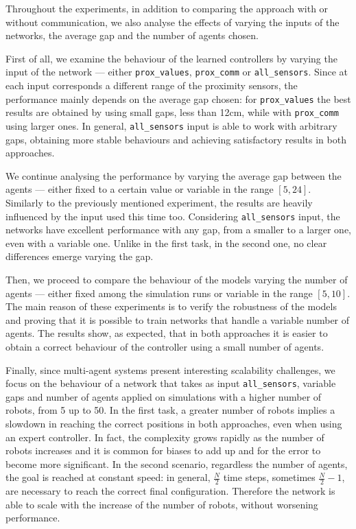 Throughout the experiments, in addition to comparing the approach with or 
without communication, we also analyse the effects of varying the inputs of the 
networks, the average gap and the number of agents chosen. 

First of all, we examine the behaviour of the learned controllers by varying the 
input of the network — either \texttt{prox\_values}, \texttt{prox\_comm} or 
\texttt{all\_sensors}. Since at each input corresponds a different range of the 
proximity sensors, the performance mainly depends on the average gap chosen: 
for \texttt{prox\_values} the best results are obtained by using small gaps, less 
than 12cm, while with \texttt{prox\_comm} using larger ones. In general, 
\texttt{all\_sensors} input is able to work with arbitrary gaps, obtaining more 
stable behaviours and achieving satisfactory results in both approaches.

We continue analysing the performance by varying the average gap between the 
agents — either fixed to a certain value or variable in the range $[5, 24]$. 
Similarly to the previously mentioned experiment, the results are heavily 
influenced by the input used this time too. Considering \texttt{all\_sensors} input, 
the networks have excellent performance with any gap, from a smaller to a larger 
one, even with a variable one. Unlike in the first task, in the second one, no clear 
differences emerge varying the gap. 

Then, we proceed to compare the behaviour of the models varying the number of 
agents — either fixed among the simulation runs or variable in the range $[5, 
10]$. The main reason of these experiments is to verify the robustness of the 
models and proving that it is possible to train networks that handle a variable 
number of agents.
The results show, as expected, that in both approaches it is easier to obtain a 
correct behaviour of the controller using a small number of agents.

Finally, since multi-agent systems present interesting scalability challenges, we 
focus on the behaviour of a network that takes as input \texttt{all\_sensors}, 
variable gaps and number of agents applied on simulations with a higher number 
of robots, from 5 up to 50.
In the first task, a greater number of robots implies a slowdown in reaching the 
correct positions in both approaches, even when using an expert controller. 
In fact, the complexity grows rapidly as the number of robots increases and it is 
common for biases to add up and for the error to become more significant.
In the second scenario, regardless the number of agents, the goal is reached at 
constant speed: in general, $\frac{N}{2}$ time steps, sometimes $\frac{N}{2} - 1$, 
are necessary to reach the correct final configuration. Therefore the network is 
able to scale with the increase of the number of robots, without worsening 
performance.

